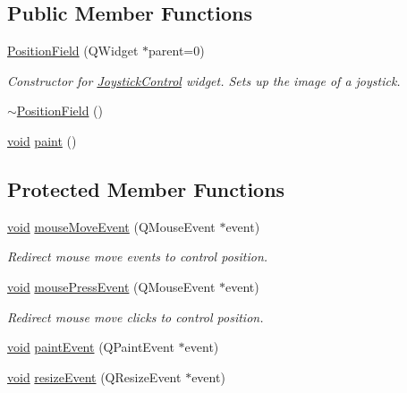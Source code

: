\subsection*{Public Member Functions}
\begin{DoxyCompactItemize}
\item 
\hyperlink{group___g_c_s_control_gadget_plugin_ga41712deeb21d497420f784aacbf72e29}{Position\-Field} (Q\-Widget $\ast$parent=0)
\begin{DoxyCompactList}\small\item\em Constructor for \hyperlink{class_joystick_control}{Joystick\-Control} widget. Sets up the image of a joystick. \end{DoxyCompactList}\item 
\hyperlink{group___g_c_s_control_gadget_plugin_ga4d08deed807894efd521d1f56338650d}{$\sim$\-Position\-Field} ()
\item 
\hyperlink{group___u_a_v_objects_plugin_ga444cf2ff3f0ecbe028adce838d373f5c}{void} \hyperlink{group___g_c_s_control_gadget_plugin_ga24b8b76a9c4255dc4777eed27af0a5de}{paint} ()
\end{DoxyCompactItemize}
\subsection*{Protected Member Functions}
\begin{DoxyCompactItemize}
\item 
\hyperlink{group___u_a_v_objects_plugin_ga444cf2ff3f0ecbe028adce838d373f5c}{void} \hyperlink{group___g_c_s_control_gadget_plugin_gafb1fc61ba09724c992e090e61ea70a77}{mouse\-Move\-Event} (Q\-Mouse\-Event $\ast$event)
\begin{DoxyCompactList}\small\item\em Redirect mouse move events to control position. \end{DoxyCompactList}\item 
\hyperlink{group___u_a_v_objects_plugin_ga444cf2ff3f0ecbe028adce838d373f5c}{void} \hyperlink{group___g_c_s_control_gadget_plugin_ga4e4feaca4c455eaf3f781ac5c02eb0ad}{mouse\-Press\-Event} (Q\-Mouse\-Event $\ast$event)
\begin{DoxyCompactList}\small\item\em Redirect mouse move clicks to control position. \end{DoxyCompactList}\item 
\hyperlink{group___u_a_v_objects_plugin_ga444cf2ff3f0ecbe028adce838d373f5c}{void} \hyperlink{group___g_c_s_control_gadget_plugin_gad910afda0ec90e5e5e1dd3abd854f709}{paint\-Event} (Q\-Paint\-Event $\ast$event)
\item 
\hyperlink{group___u_a_v_objects_plugin_ga444cf2ff3f0ecbe028adce838d373f5c}{void} \hyperlink{group___g_c_s_control_gadget_plugin_ga4f1879516e3c2fb610a4ebe9f5cb217e}{resize\-Event} (Q\-Resize\-Event $\ast$event)
\end{DoxyCompactItemize}


